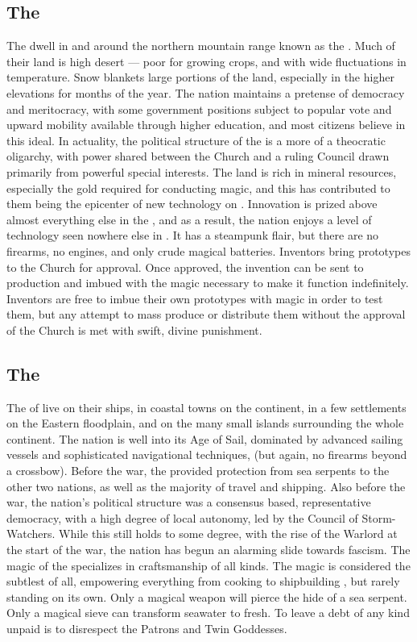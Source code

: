 \documentclass[blue]{GL2020}
\begin{document}
\subsection*{The \pTech{}}
The \pTech{} dwell in and around the northern mountain range known as the \pSpine{}. Much of their land is high desert — poor for growing crops, and with wide fluctuations in temperature. Snow blankets large portions of the land, especially in the higher elevations for months of the year. The nation maintains a pretense of democracy and meritocracy, with some government positions subject to popular vote and upward mobility available through higher education, and most citizens believe in this ideal. In actuality, the political structure of the \pTech{} is a more of a theocratic oligarchy, with power shared between the Church and a ruling Council drawn primarily from powerful special interests. The \pTech{} land is rich in mineral resources, especially the gold required for conducting magic, and this has contributed to them being the epicenter of new technology on \pEarth{}. Innovation is prized above almost everything else in the \pTech{}, and as a result, the nation enjoys a level of technology seen nowhere else in \pEarth{}. It has a steampunk flair, but there are no firearms, no engines, and only crude magical batteries. Inventors bring prototypes to the Church for approval. Once approved, the invention can be sent to production and imbued with the magic necessary to make it function indefinitely. Inventors are free to imbue their own prototypes with magic in order to test them, but any attempt to mass produce or distribute them without the approval of the Church is met with swift, divine punishment.

\subsection*{The \pShip{}}
The \pShippies{} of \pShip{} live on their ships, in coastal towns on the continent, in a few settlements on the Eastern floodplain, and on the many small islands surrounding the whole continent. The nation is well into its Age of Sail, dominated by advanced sailing vessels and sophisticated navigational techniques, (but again, no firearms beyond a crossbow). Before the war, the \pShippies{} provided protection from sea serpents to the other two nations, as well as the majority of travel and shipping. Also before the war, the nation's political structure was a consensus based, representative democracy, with a high degree of local autonomy, led by the Council of Storm-Watchers. While this still holds to some degree, with the rise of the Warlord \cLoud{\full} at the start of the war, the nation has begun an alarming slide towards fascism. The magic of the \pShippies{} specializes in craftsmanship of all kinds. The \pShip{} magic is considered the subtlest of all, empowering everything from cooking to shipbuilding , but rarely standing on its own. Only a magical weapon will pierce the hide of a sea serpent. Only a magical sieve can transform seawater to fresh. To leave a debt of any kind unpaid is to disrespect the Patrons \cEbbFull{} and \cFlowFull{}Twin Goddesses.
\end{document}
